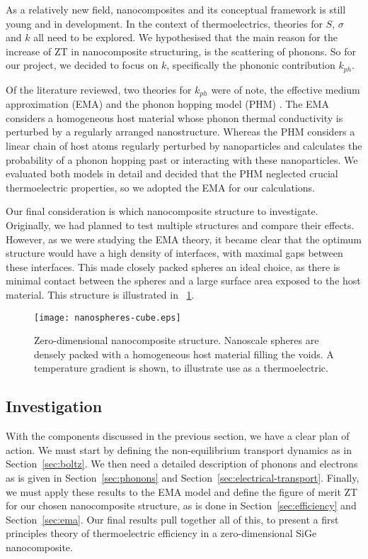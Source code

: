 \documentclass[12pt]{article}
\newcommand{\figref}[2][\figurename~]{#1\ref{#2}}
\newcommand{\secref}[2][Section~]{#1\ref{#2}}
\begin{document}
As a relatively new field, nanocomposites and its conceptual framework is still young and in development. In the context of thermoelectrics, theories for $S$, $\sigma$ and $k$ all need to be explored. We hypothesised that the main reason for the increase of ZT in nanocomposite structuring, is the scattering of phonons. So for our project, we decided to focus on $k$, specifically the phononic contribution $k_{ph}$. 

Of the literature reviewed, two theories for $k_{ph}$ were of note, the effective medium approximation (EMA) \cite{ema} and the phonon hopping model (PHM) \cite{phm}. The EMA considers a homogeneous host material whose phonon thermal conductivity is perturbed by a regularly arranged nanostructure. Whereas the PHM considers a linear chain of host atoms regularly perturbed by nanoparticles and calculates the probability of a phonon hopping past or interacting with these nanoparticles. We evaluated both models in detail and decided that the PHM neglected crucial thermoelectric properties, so we adopted the EMA for our calculations.

Our final consideration is which nanocomposite structure to investigate. Originally, we had planned to test multiple structures and compare their effects. However, as we were studying the EMA theory, it became clear that the optimum structure would have a high density of interfaces, with maximal gaps between these interfaces. This made closely packed spheres an ideal choice, as there is minimal contact between the spheres and a large surface area exposed to the host material. This structure is illustrated in \figref{fig:nanospheres-cube}.

\begin{figure}
	\centering
	\texttt{[image: nanospheres-cube.eps]}
	\caption{Zero-dimensional nanocomposite structure. Nanoscale spheres are densely packed with a homogeneous host material filling the voids. A temperature gradient is shown, to illustrate use as a thermoelectric.}
	\label{fig:nanospheres-cube}
\end{figure}

\subsection{Investigation}
With the components discussed in the previous section, we have a clear plan of action. We must start by defining the non-equilibrium transport dynamics as in \secref{sec:boltz}. We then need a detailed description of phonons and electrons as is given in \secref{sec:phonons} and \secref{sec:electrical-transport}. Finally, we must apply these results to the EMA model and define the figure of merit ZT for our chosen nanocomposite structure, as is done in \secref{sec:efficiency} and \secref{sec:ema}. Our final results pull together all of this, to present a first principles theory of thermoelectric efficiency in a zero-dimensional SiGe nanocomposite.
\end{document}
